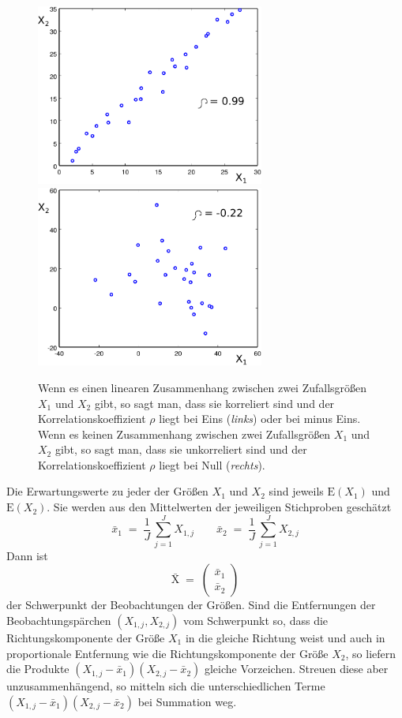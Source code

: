 \begin{figure}
	\begin{center}
		\includegraphics[width=75mm]{01_vorlesung/media/korreliert.pdf} \hspace{5mm}
		\includegraphics[width=75mm]{01_vorlesung/media/unkorreliert.pdf}
		\caption{\label{korrelation} Wenn es einen linearen Zusammenhang zwischen
			zwei Zufallsgrößen $X_1$ und $X_2$ gibt, so sagt man, dass sie korreliert sind
			und der Korrelationskoeffizient $\rho$ liegt bei Eins (\textsl{links}) oder bei
			minus Eins. Wenn es keinen Zusammenhang zwischen zwei Zufallsgrößen $X_1$ und $X_2$
			gibt, so sagt man, dass sie unkorreliert sind
			und der Korrelationskoeffizient $\rho$ liegt bei Null (\textsl{rechts}).}
	\end{center}
\end{figure}

Die Erwartungswerte zu jeder der Größen $X_1$ und $X_2$ sind jeweils
$\mathrm{E}(X_1)$ und $\mathrm{E}(X_2)$. Sie werden aus den Mittelwerten der jeweiligen
Stichproben geschätzt
\begin{equation}
\bar x_1 \; = \; \frac{1}{J} \, \sum_{j = 1}^J X_{1,j} \qquad
\bar x_2 \; = \; \frac{1}{J} \, \sum_{j = 1}^J X_{2,j}
\end{equation}
Dann ist
\begin{equation}
\mathrm{\bar X} \; = \;
\left(\begin{array}{c}
\bar x_1 \\
\bar x_2
\end{array}
\right)
\end{equation}
der Schwerpunkt der Beobachtungen der Größen.
Sind die Entfernungen der Beobachtungs\-pärchen $(X_{1,j}, X_{2,j})$ vom Schwerpunkt so,
dass die Richtungskomponente der Größe $X_1$ in die gleiche Richtung weist und auch in
proportionale Entfernung wie die Richtungskomponente der Größe $X_2$, so liefern die 
Produkte $(X_{1,j} - \bar x_1)(X_{2,j} - \bar x_2)$ gleiche Vorzeichen. Streuen diese
aber unzusammenhängend, so mitteln sich die unterschiedlichen Terme
$(X_{1,j} - \bar x_1)(X_{2,j} - \bar x_2)$ bei Summation weg.

